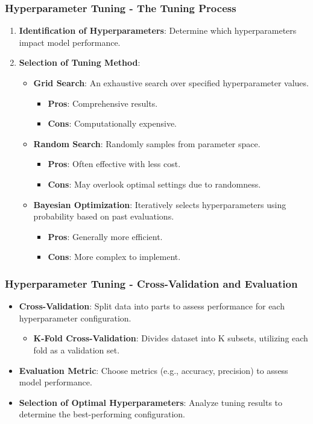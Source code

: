 \documentclass[aspectratio=169]{beamer}
\begin{document}
\begin{frame}[fragile]
    \frametitle{Hyperparameter Tuning - The Tuning Process}
    \begin{enumerate}
        \item \textbf{Identification of Hyperparameters}: Determine which hyperparameters impact model performance.
        \item \textbf{Selection of Tuning Method}:
        \begin{itemize}
            \item \textbf{Grid Search}: An exhaustive search over specified hyperparameter values.
                \begin{itemize}
                    \item \textbf{Pros}: Comprehensive results.
                    \item \textbf{Cons}: Computationally expensive.
                \end{itemize}
            \item \textbf{Random Search}: Randomly samples from parameter space.
                \begin{itemize}
                    \item \textbf{Pros}: Often effective with less cost.
                    \item \textbf{Cons}: May overlook optimal settings due to randomness.
                \end{itemize}
            \item \textbf{Bayesian Optimization}: Iteratively selects hyperparameters using probability based on past evaluations.
                \begin{itemize}
                    \item \textbf{Pros}: Generally more efficient.
                    \item \textbf{Cons}: More complex to implement.
                \end{itemize}
        \end{itemize}
    \end{enumerate}
\end{frame}

\begin{frame}[fragile]
    \frametitle{Hyperparameter Tuning - Cross-Validation and Evaluation}
    \begin{itemize}
        \item \textbf{Cross-Validation}: Split data into parts to assess performance for each hyperparameter configuration.
            \begin{itemize}
                \item \textbf{K-Fold Cross-Validation}: Divides dataset into K subsets, utilizing each fold as a validation set.
            \end{itemize}
        \item \textbf{Evaluation Metric}: Choose metrics (e.g., accuracy, precision) to assess model performance.
        \item \textbf{Selection of Optimal Hyperparameters}: Analyze tuning results to determine the best-performing configuration.
    \end{itemize}
\end{frame}
\end{document}
